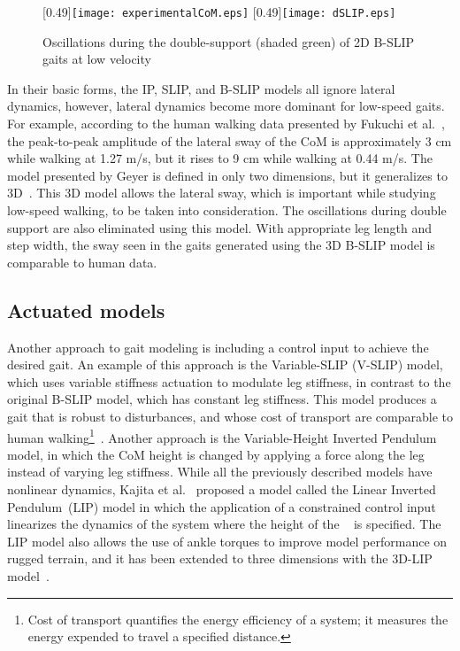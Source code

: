 \begin{figure}
	\centering
	[0.49\textwidth]{\texttt{[image: experimentalCoM.eps]}}%
	\hfill
	[0.49\textwidth]{\texttt{[image: dSLIP.eps]}}%
	\caption{Oscillations during the double-support (shaded green) of 2D B-SLIP gaits at low velocity} \label{fig:traj_compare}
\end{figure}

In their basic forms, the IP, SLIP, and B-SLIP models all ignore lateral dynamics, however, lateral dynamics become more dominant for low-speed gaits. For example, according to the human walking data presented by Fukuchi et al.~\cite{fukuchi2018public}, the peak-to-peak amplitude of the lateral sway of the CoM is approximately 3 cm while walking at 1.27 m/s, but it rises to 9 cm while walking at 0.44 m/s. The model presented by Geyer is defined in only two dimensions, but it generalizes to 3D~\cite{liu2015dynamic,liu2016terrain}. This 3D model allows the lateral sway, which is important while studying low-speed walking, to be taken into consideration. The  oscillations during double support are also eliminated using this model. With appropriate leg length and step width, the sway seen in the gaits generated using the 3D B-SLIP model is comparable to human data. %

\subsection{Actuated models}

Another approach to gait modeling is including a control input to achieve the desired gait. An example of this approach is the Variable-SLIP (V-SLIP) model, which uses variable stiffness actuation to modulate leg stiffness, in contrast to the original B-SLIP model, which has constant leg stiffness. This model produces a gait that is robust to disturbances, and whose cost of transport are comparable to human walking\footnote{Cost of transport quantifies the energy efficiency of a system; it measures the energy expended to travel a specified distance.}~\cite{visser2017bipedal}. Another approach is the Variable-Height Inverted Pendulum model, in which the CoM height is changed by applying a force along the leg~\cite{koolen2016balance} instead of varying leg stiffness. While all the previously described models have nonlinear dynamics, Kajita et al.~\cite{kajita1991study} proposed a model called the Linear Inverted Pendulum~(LIP) model in which the application of a constrained control input linearizes the dynamics of the system where the height of the \com~ is specified. The LIP model also allows the use of ankle torques to improve model performance on rugged terrain, and it has been extended to three dimensions with the 3D-LIP model~\cite{kajita20013d}.

